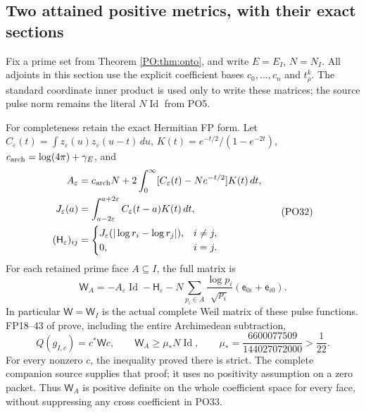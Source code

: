 \documentclass[11pt,a4paper]{article}
\theoremstyle{definition}\newtheorem{definition}[theorem]{Definition}
\begin{document}
\subsection{Two attained positive metrics, with their exact sections}

Fix a prime set from Theorem \ref{PO:thm:onto}, and write
\(E=E_I\), \(N=N_I\). All adjoints in this section use the
explicit coefficient bases \(c_0,\ldots,c_n\) and
\(t_\rho^k\). The standard coordinate inner product is used
only to write these matrices; the source pulse norm remains
the literal \(N\operatorname{Id}\) from PO5.

For completeness retain the exact Hermitian FP form.
Let \(C_\varepsilon(t)=\int z_\varepsilon(u)z_\varepsilon(u-t)\,du\),
\(K(t)=e^{-t/2}/(1-e^{-2t})\),
\(c_{\rm arch}=\log(4\pi)+\gamma_E\), and
\[
 \begin{aligned}
 A_\varepsilon&=c_{\rm arch}N+
       2\int_0^\infty[C_\varepsilon(t)-Ne^{-t/2}]K(t)\,dt,\\
 J_\varepsilon(a)&=\int_{a-2\varepsilon}^{a+2\varepsilon}C_\varepsilon(t-a)K(t)\,dt,\\
 (\mathsf H_\varepsilon)_{ij}
   &=\begin{cases}J_\varepsilon(|\log r_i-\log r_j|),&i\ne j,\\0,&i=j.\end{cases}
 \end{aligned}
 \tag{PO32}
\]
For each retained prime face \(A\subseteq I\), the full matrix is
\[
 \mathsf W_A=-A_\varepsilon\operatorname{Id}-\mathsf H_\varepsilon
    -N\sum_{p_i\in A}\frac{\log p_i}{\sqrt{p_i}}
                         (\mathsf e_{0i}+\mathsf e_{i0}).
 \tag{PO33}\label{PO:po:FPmatrix}
\]
In particular \(\mathsf W=\mathsf W_I\) is the actual complete
Weil matrix of these pulse functions. FP18--43 of \cite{PO:FP}
prove, including the entire Archimedean subtraction,
\[
 Q(g_{I,c})=c^*\mathsf Wc,\qquad
 \mathsf W_A\ge\mu_*N\operatorname{Id},\qquad
 \mu_*=\frac{6600077509}{144027072000}>\frac1{22}.
 \tag{PO34}\label{PO:po:coercive}
\]
For every nonzero \(c\), the inequality proved there is strict.
The complete companion source supplies that proof; it uses no
positivity assumption on a zero packet.
Thus \(\mathsf W_A\) is positive definite on the whole
coefficient space for every face, without suppressing any
cross coefficient in PO33.
\end{document}
